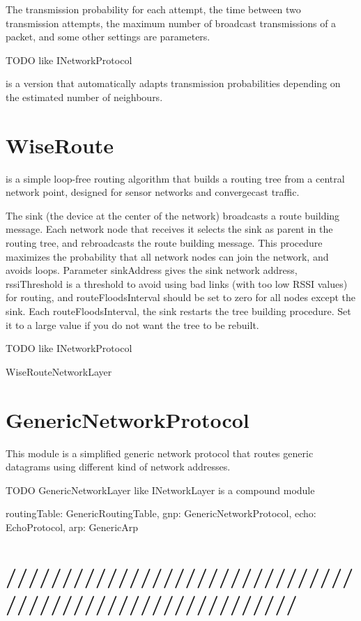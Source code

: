 The transmission probability for each attempt, the time between two transmission
attempts, the maximum number of broadcast transmissions of a packet, and
some other settings are parameters.

TODO like INetworkProtocol

 is a version that automatically 
adapts transmission probabilities depending on the estimated number of 
neighbours.

\section{WiseRoute}

 is a simple loop-free routing algorithm that
builds a routing tree from a central network point, designed
for sensor networks and convergecast traffic.

The sink (the device at the center of the network) broadcasts
a route building message. Each network node that receives it
selects the sink as parent in the routing tree, and rebroadcasts
the route building message. This procedure maximizes the probability
that all network nodes can join the network, and avoids loops.
Parameter sinkAddress gives the sink network address,
rssiThreshold is a threshold to avoid using bad links (with too low
RSSI values) for routing, and routeFloodsInterval should be set to
zero for all nodes except the sink. Each routeFloodsInterval, the
sink restarts the tree building procedure. Set it to a large value
if you do not want the tree to be rebuilt.

TODO like INetworkProtocol

WiseRouteNetworkLayer

\section{GenericNetworkProtocol}

This module is a simplified generic network protocol that routes
generic datagrams using different kind of network addresses. 

TODO GenericNetworkLayer like INetworkLayer  is a compound module

routingTable: GenericRoutingTable,
gnp: GenericNetworkProtocol,
echo: EchoProtocol,
arp: GenericArp


\section{/////////////////////////////////////////////////////////}


